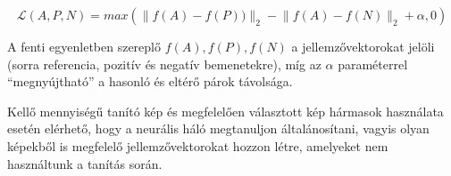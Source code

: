 

\[ \mathcal{L}(A,P,N) = max \left( \lVert f(A) - f(P)) \rVert_2 - \lVert f(A) - f(N) \rVert_2 + \alpha, 0 \right) \]

A fenti egyenletben szereplő $f(A), f(P), f(N)$ a jellemzővektorokat jelöli (sorra referencia, pozitív és negatív bemenetekre), míg az $\alpha$ paraméterrel ``megnyújtható'' a hasonló és eltérő párok távolsága. 


Kellő mennyiségű tanító kép és megfelelően választott kép hármasok használata esetén elérhető, hogy a neurális háló megtanuljon általánosítani, vagyis olyan képekből is megfelelő jellemzővektorokat hozzon létre, amelyeket nem használtunk a tanítás során. 


